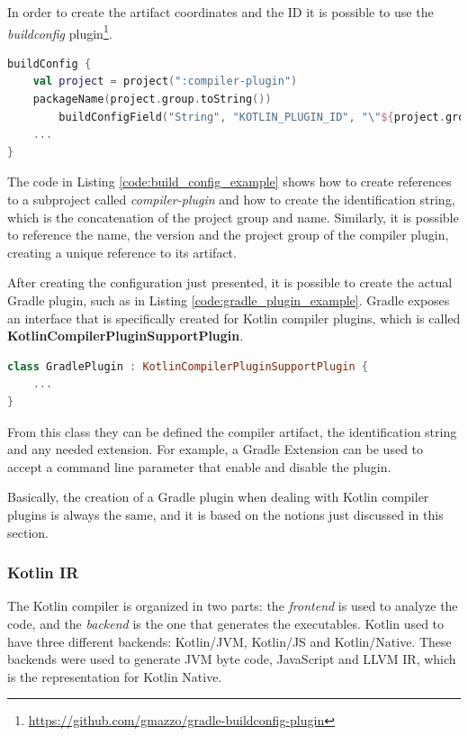 In order to create the artifact coordinates and the ID it is possible to use the \textit{buildconfig} plugin\footnote{\url{https://github.com/gmazzo/gradle-buildconfig-plugin}}.
\begin{lstlisting}[caption={Example of a \textit{buildconfig} that creates the compiler plugin artifact}, language=Kotlin, captionpos=b, label={code:build_config_example}]
buildConfig {
    val project = project(":compiler-plugin")
    packageName(project.group.toString())
        buildConfigField("String", "KOTLIN_PLUGIN_ID", "\"${project.group}.${project.name}\"")
    ...
}
\end{lstlisting}
The code in Listing \ref{code:build_config_example} shows how to create references to a subproject called \textit{compiler-plugin} and how to create the identification string, which is the concatenation of the project group and name. Similarly, it is possible to reference the name, the version and the project group of the compiler plugin, creating a unique reference to its artifact.

After creating the configuration just presented, it is possible to create the actual Gradle plugin, such as in Listing \ref{code:gradle_plugin_example}. Gradle exposes an interface that is specifically created for Kotlin compiler plugins, which is called \textbf{KotlinCompilerPluginSupportPlugin}.
\begin{lstlisting}[caption={Gradle plugin class example}, language=Kotlin, captionpos=b, label={code:gradle_plugin_example}]
class GradlePlugin : KotlinCompilerPluginSupportPlugin {
    ...
}
\end{lstlisting}
From this class they can be defined the compiler artifact, the identification string and any needed extension. For example, a Gradle Extension can be used to accept a command line parameter that enable and disable the plugin.

Basically, the creation of a Gradle plugin when dealing with Kotlin compiler plugins is always the same, and it is based on the notions just discussed in this section.

\subsubsection{Kotlin IR}\label{section:kotlin_ir}
The Kotlin compiler is organized in two parts: the \textit{frontend} is used to analyze the code, and the \textit{backend} is the one that generates the executables.\newline
Kotlin used to have three different backends: Kotlin/JVM, Kotlin/JS and Kotlin/Native. These backends were used to generate JVM byte code, JavaScript and LLVM IR, which is the representation for Kotlin Native.

